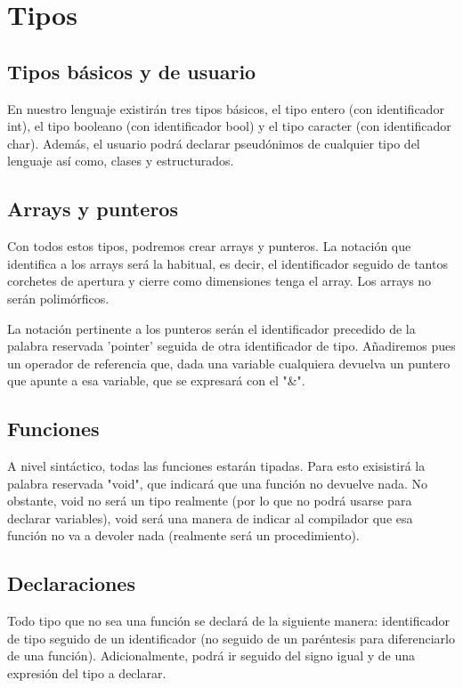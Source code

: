 \documentclass{article}
\begin{document}
\section{Tipos}

\subsection{Tipos básicos y de usuario}

En nuestro lenguaje existirán tres tipos básicos, el tipo entero (con identificador int), el tipo booleano (con identificador bool) y el tipo caracter (con identificador char). Además, el usuario podrá declarar pseudónimos de cualquier tipo del lenguaje así como, clases y estructurados.

\subsection{Arrays y punteros}
Con todos estos tipos, podremos crear arrays y punteros. La notación que identifica a los arrays será la habitual, es decir, el identificador seguido de tantos corchetes de apertura y cierre como dimensiones tenga el array. Los arrays no serán polimórficos.

La notación pertinente a los punteros serán el identificador precedido de la palabra reservada 'pointer' seguida de otra identificador de tipo. Añadiremos pues un operador de referencia que, dada una variable cualquiera devuelva un puntero que apunte a esa variable, que se expresará con el "\&".

\subsection{Funciones}

A nivel sintáctico, todas las funciones estarán tipadas. Para esto exisistirá la palabra reservada "void", que indicará que una función no devuelve nada. No obstante, void no será un tipo realmente (por lo que no podrá usarse para declarar variables), void será una manera de indicar al compilador que esa función no va a devoler nada (realmente será un procedimiento).

\subsection{Declaraciones}

Todo tipo que no sea una función se declará de la siguiente manera: identificador de tipo seguido de un identificador (no seguido de un paréntesis para diferenciarlo de una función). Adicionalmente, podrá ir seguido del signo igual y de una expresión del tipo a declarar. 
\end{document}
